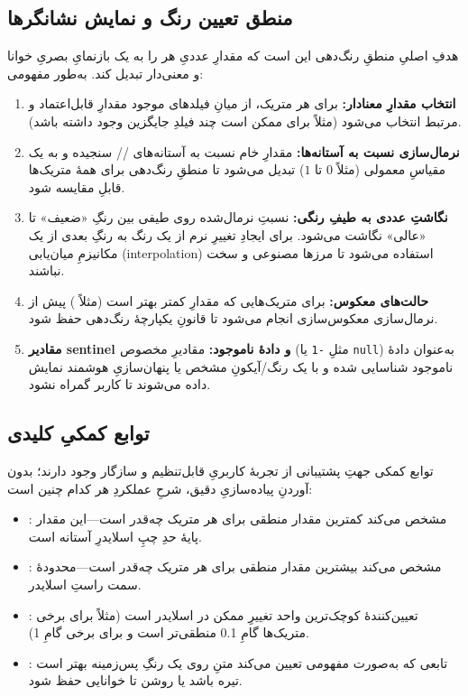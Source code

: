 \subsection{منطق تعیین رنگ و نمایش نشانگرها}
هدفِ اصلیِ منطقِ رنگ‌دهی این است که مقدارِ عددیِ هر  را به یک بازنمایِ بصریِ خوانا و معنی‌دار تبدیل کند. به‌طور مفهومی:
\begin{enumerate}
  \item \textbf{انتخاب مقدارِ معنادار:} برای هر متریک، از میانِ فیلدهای موجود مقدارِ قابل‌اعتماد و مرتبط انتخاب می‌شود (مثلاً برای  ممکن است چند فیلدِ جایگزین وجود داشته باشد).
  \item \textbf{نرمال‌سازی نسبت به آستانه‌ها:} مقدارِ خام نسبت به آستانه‌های // سنجیده و به یک مقیاسِ معمولی (مثلاً \(0\) تا \(1\)) تبدیل می‌شود تا منطقِ رنگ‌دهی برای همهٔ متریک‌ها قابلِ مقایسه شود.
  \item \textbf{نگاشتِ عددی به طیفِ رنگی:} نسبتِ نرمال‌شده روی طیفی بین رنگِ «ضعیف» تا «عالی» نگاشت می‌شود. برای ایجادِ تغییرِ نرم از یک رنگ به رنگِ بعدی از یک مکانیزمِ میان‌یابی (interpolation) استفاده می‌شود تا مرزها مصنوعی و سخت نباشند.
  \item \textbf{حالت‌های معکوس:} برای متریک‌هایی که مقدارِ کمتر بهتر است (مثلاً ) پیش از نرمال‌سازی معکوس‌سازی انجام می‌شود تا قانونِ یکپارچهٔ رنگ‌دهی حفظ شود.
  \item \textbf{مقادیر sentinel و دادهٔ ناموجود:} مقادیرِ مخصوص (مثلِ \verb|-1| یا \verb|null|) به‌عنوان دادهٔ ناموجود شناسایی شده و با یک رنگ/آیکونِ مشخص یا پنهان‌سازیِ هوشمند نمایش داده می‌شوند تا کاربر گمراه نشود.
\end{enumerate}

\subsection{توابع کمکیِ کلیدی}
توابع کمکی جهتِ پشتیبانی از تجربهٔ کاربریِ قابل‌تنظیم و سازگار وجود دارند؛ بدون آوردنِ پیاده‌سازیِ دقیق، شرحِ عملکردِ هر کدام چنین است:
\begin{itemize}
    \item {}: مشخص می‌کند کمترین مقدار منطقی برای هر متریک چه‌قدر است—این مقدار پایهٔ حدِ چپِ اسلایدرِ آستانه است.
    \item {}: مشخص می‌کند بیشترین مقدار منطقی برای هر متریک چه‌قدر است—محدودهٔ سمت راستِ اسلایدر.
    \item {}: تعیین‌کنندهٔ کوچک‌ترین واحد تغییرِ ممکن در اسلایدر است (مثلاً برای برخی متریک‌ها گامِ 0.1 منطقی‌تر است و برای برخی گامِ 1).
    \item {}: تابعی که به‌صورت مفهومی تعیین می‌کند متنِ روی یک رنگِ پس‌زمینه بهتر است تیره باشد یا روشن تا خوانایی حفظ شود.
\end{itemize}

